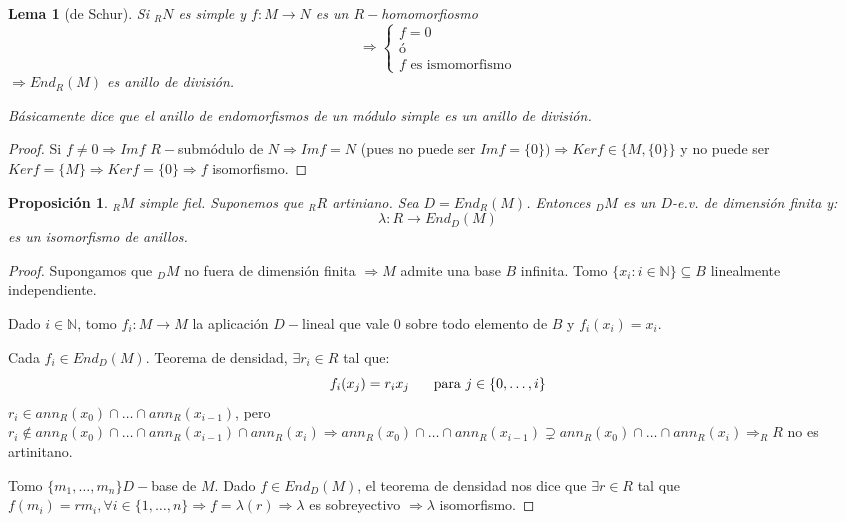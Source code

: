 \documentclass[11pt,a4paper]{article}
\theoremstyle{break}
\newtheorem{lemma}[theorem]{Lema}
\newtheorem{proposition}[theorem]{Proposición}
\begin{document}
\begin{lemma}[de Schur]
Si $_{R}N$ es simple y $f: M \to N$ es un $R-$homomorfiosmo 
$$\Rightarrow \begin{cases}
f = 0 \\
\text{ó} \\
f \text{ es ismomorfismo}
\end{cases}$$
$\Rightarrow End_{R}(M)$ es anillo de división.

Básicamente dice que el anillo de endomorfismos de un módulo simple es un anillo de división.
\end{lemma}

\begin{proof}
Si $f \neq 0 \Rightarrow Im f$ $R-$submódulo de $N \Rightarrow Imf = N$ (pues no puede ser $Im f = \{0\}) \Rightarrow Ker f \in \{M, \{0\}\}$ y no puede ser $Ker f = \{M\} \Rightarrow Ker f = \{0\} \Rightarrow f$ isomorfismo.
\end{proof}


\begin{proposition}
$_{R}M$ simple fiel. Suponemos que $_{R}R$ artiniano. Sea $D = End_{R}(M)$. Entonces $_{D}M$ es un $D$-e.v. de dimensión finita y:
$$\lambda: R \to End_{D}(M)$$
es un isomorfismo de anillos.
\end{proposition}

\begin{proof}
Supongamos que $_{D}M$ no fuera de dimensión finita $\Rightarrow M$ admite una base $B$ infinita. Tomo $\{x_{i}: i \in \mathbb{N}\} \subseteq B$ linealmente independiente.

Dado $i \in \mathbb{N}$, tomo $f_{i}: M \to M$ la aplicación $D-$lineal que vale 0 sobre todo elemento de $B$ y $f_{i}(x_{i}) = x_{i}$.

Cada $f_{i} \in End_{D}(M)$. Teorema de densidad, $\exists r_{i} \in R$ tal que:
$$f_{i}(x_{j}) = r_{i}x_{j} \hspace{0.5cm} \text{ para } j \in \{0, \dots, i\}$$
$r_{i} \in ann_{R}(x_{0}) \cap \dots \cap ann_{R}(x_{i-1})$, pero $r_{i} \notin ann_{R}(x_{0}) \cap \dots \cap ann_{R}(x_{i-1}) \cap ann_{R}(x_{i}) \Rightarrow ann_{R}(x_{0}) \cap \dots \cap ann_{R}(x_{i-1}) \supsetneq ann_{R}(x_{0}) \cap \dots \cap ann_{R}(x_{i}) \Rightarrow _{R}R$ no es artinitano.

Tomo $\{m_{1}, \dots, m_{n}\} D-$base de $M$. Dado $f \in End_{D}(M)$, el teorema de densidad nos dice que $\exists r \in R$ tal que $f(m_{i}) = rm_{i}, \forall i \in \{1, \dots, n\} \Rightarrow f = \lambda(r) \Rightarrow \lambda $ es sobreyectivo $\Rightarrow \lambda$ isomorfismo.
\end{proof}
\end{document}
